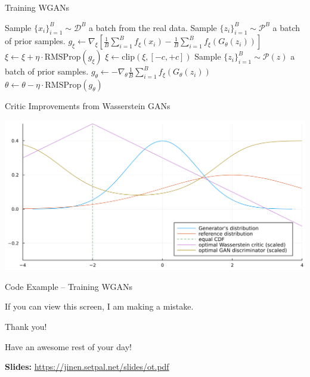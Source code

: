 \documentclass{beamer}
\begin{document}
\begin{frame}{Training WGANs}
	\begin{algorithm}[H]
		\caption{WGAN training algorithm. $\eta = 10^{-5},~c=0.01,~n_{\text{critic}}=5,~n_{\text{iter}} = 500$.}\label{algo::wgan}
		\begin{algorithmic}[1]
			\State Sample $\{x_i\}_{i=1}^B \sim \mathcal{D}^B$ a batch from the real data.
			\State Sample $\{z_i\}_{i=1}^B \sim \mathcal{P}^B$ a batch of prior samples.
			\State $g_\xi \gets \nabla_\xi \left[\frac{1}{B}\sum_{i=1}^B f_\xi(x_i) - \frac{1}{B} \sum_{i=1}^B f_\xi(G_\theta(z_i)) \right]$
			\State $\xi \gets \xi + \eta \cdot \text{RMSProp}(g_\xi) $
			\State $\xi \gets \text{clip}(\xi, [-c, +c]) $
			\EndFor
			\State Sample $\{z_i\}_{i=1}^B \sim \mathcal{P}(z)$ a batch of prior samples.
			\State $g_\theta \gets -\nabla_\theta \frac{1}{B} \sum_{i=1}^B f_\xi(G_\theta(z_i))$ 
			\State $\theta \gets \theta - \eta \cdot \text{RMSProp}(g_\theta)$
			\EndFor
		\end{algorithmic}
	\end{algorithm}
\end{frame}

\begin{frame}{Critic Improvements from Wasserstein GANs}
	\begin{center}
		\includegraphics[width=\textwidth]{img/wgan_grad_compare.png}
	\end{center}
\end{frame}

\begin{frame}{Code Example -- Training WGANs}
	\begin{center}
		If you can view this screen, I am making a mistake.
	\end{center}
\end{frame}

\begin{frame}{Thank you!}
	\begin{center}
		Have an awesome rest of your day!
	\end{center}
	\begin{center}
		\textbf{Slides:} \url{https://jinen.setpal.net/slides/ot.pdf}
	\end{center}
\end{frame}
\end{document}
